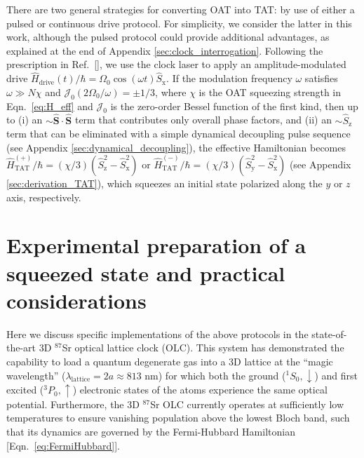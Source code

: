 \documentclass[aps,prx,superscriptaddress,notitlepage,twocolumn,longbibliography]{revtex4-1}
\renewcommand{\t}{\text} %
\newcommand{\p}[1]{\left(#1\right)} %
\renewcommand{\c}{\cdot} %
\renewcommand{\v}{\bm} %
\newcommand{\J}{\mathcal{J}}
\newcommand{\z}{\text{z}}
\newcommand{\x}{\text{x}}
\newcommand{\y}{\text{y}}
\newcommand{\up}{\uparrow}
\newcommand{\dn}{\downarrow}
\begin{document}
There are two general strategies for converting OAT into TAT: by use of either a pulsed\cite{liu2011spin} or continuous\cite{huang2015twoaxis} drive protocol.
For simplicity, we consider the latter in this  work, although the pulsed protocol could provide additional advantages, as explained at the end of Appendix \ref{sec:clock_interrogation}.
Following the prescription in Ref.~[], we use the clock laser to apply an amplitude-modulated drive $\hat H_{\t{drive}}(t)/\hbar=\Omega_0\cos(\omega t)\hat{S}_\x$.
If the modulation frequency $\omega$ satisfies $\omega\gg N\chi$ and $\J_0\p{2\Omega_0/\omega}=\pm1/3$, where $\chi$ is the OAT squeezing strength in Eqn.~\eqref{eq:H_eff} and $\J_0$ is the zero-order Bessel function of the first kind, then up to (i) an $\sim\hat{\v S}\c\hat{\v S}$ term that contributes only overall phase factors, and (ii) an $\sim\hat S_\z$ term that can be eliminated with a simple dynamical decoupling pulse sequence (see Appendix \ref{sec:dynamical_decoupling}), the effective Hamiltonian becomes $\hat H_{\t{TAT}}^{(+)}/\hbar = (\chi/3)(\hat S_\z^2-\hat S_\x^2)$ or $\hat H_{\t{TAT}}^{(-)}/\hbar = (\chi/3)(\hat S_\y^2-\hat S_\x^2)$ (see Appendix \ref{sec:derivation_TAT}), which squeezes an initial state polarized along the $y$ or $z$ axis, respectively.


\section{Experimental preparation of a squeezed state and practical considerations}

Here we discuss specific implementations of the above protocols in the state-of-the-art 3D $^{87}$Sr optical lattice clock (OLC).
This system has demonstrated the capability to load a quantum degenerate gas into a 3D lattice at the ``magic wavelength'' ($\lambda_{\t{lattice}}=2a\approx813$ nm) for which both the ground ($^1S_0,\dn$) and first excited ($^3P_0,\up$) electronic states of the atoms experience the same optical potential\cite{campbell2017fermidegenerate}.
Furthermore, the 3D $^{87}$Sr OLC currently operates at sufficiently low temperatures to ensure vanishing population above the lowest Bloch band, such that its dynamics are governed by the Fermi-Hubbard Hamiltonian [Eqn.~\eqref{eq:FermiHubbard}]\cite{esslinger2010fermihubbard}.
\end{document}
